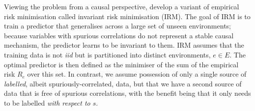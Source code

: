 Viewing the problem from a causal perspective, \cite{arjovsky2019invariant} develop a variant of empirical risk minimisation called invariant risk minimisation (IRM).
The goal of IRM is to train a predictor that generalises across a large set of unseen environments; because variables with spurious correlations do not represent a stable causal mechanism, the predictor learns to be invariant to them. IRM assumes that the training data is not \emph{iid} but is partitioned into distinct environments, $e \in E$. The optimal predictor is then defined as the minimiser of the sum of the empirical risk $R_e$ over this set. In contrast, we assume possession of only a single source of \emph{labelled}, albeit spuriously-correlated, data, but that we have a second source of data that is free of spurious correlations, with the benefit being that it only needs to be labelled \emph{with respect to $s$}.


